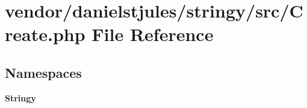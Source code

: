 \section{vendor/danielstjules/stringy/src/\+Create.php File Reference}
\label{_create_8php}
\subsection*{Namespaces}
\begin{DoxyCompactItemize}
\item 
 {\bf Stringy}
\end{DoxyCompactItemize}
